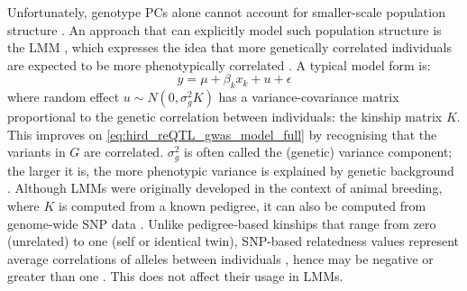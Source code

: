 Unfortunately, genotype \glspl{PC} alone cannot account for smaller-scale population structure \autocite{price2010NewApproachesPopulation}.
An approach that can explicitly model such population structure is the \gls{LMM} \autocite{price2010NewApproachesPopulation,eu-ahsunthornwattana2014ComparisonMethodsAccount,golan2018MixedModelsCaseControl},
which expresses the idea that more genetically correlated individuals are expected to be more phenotypically correlated \autocite{vilhjalmsson2013NatureConfoundingGenomewide}.
A typical model form is:
\begin{equation}
    y = \mu + \beta_k x_k + u + \epsilon
    \label{eq:hird_reQTL_gwas_model_lmm}
\end{equation}
where random effect $u \sim N(0, \sigma_g^2 K)$
has a variance-covariance matrix proportional to the genetic correlation between individuals: the kinship matrix $K$.
This improves on \cref{eq:hird_reQTL_gwas_model_full} by recognising that the variants in $G$ are correlated.
$\sigma_g^2$ is often called the (genetic) variance component; the larger it is, the more phenotypic variance is explained by genetic background \autocite{golan2018MixedModelsCaseControl}.
Although \glspl{LMM} were originally developed in the context of animal breeding, where $K$ is computed from a known pedigree,
it can also be computed from genome-wide \gls{SNP} data \autocite{eu-ahsunthornwattana2014ComparisonMethodsAccount,sul2018PopulationStructureGenetic}.
Unlike pedigree‐based kinships that range from zero (unrelated) to one (self or identical twin),
\gls{SNP}-based relatedness values represent average correlations of alleles between individuals \autocite{speed2017ReevaluationSNPHeritability},
hence may be negative or greater than one \autocite{wang2014MarkerbasedEstimatesRelatedness}.
This does not affect their usage in \glspl{LMM}.
%
%
%
%

